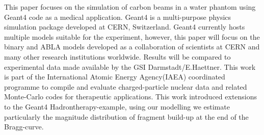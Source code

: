 \begin{abstractpage}[english]
This paper focuses on the simulation of carbon beams in a water phantom using Geant4 code as a medical application. Geant4 is a multi-purpose physics simulation package developed at CERN, Switzerland. Geant4 currently hosts multiple models suitable for the experiment, however, this paper will focus on the binary and ABLA models developed as a collaboration of scientists at CERN and many other research institutions worldwide. Results will be compared to experimental data made available by the GSI Darmstadt/E.Haettner. This work is part of the International Atomic Energy Agency(IAEA) coordinated programme to compile and evaluate charged-particle nuclear data and related Monte-Carlo codes for therapeutic applications. This work introduced extensions to the Geant4 Hadrontherapy-example, using our modelling we estimate particularly the magnitude distribution of fragment build-up at the end of the Bragg-curve.
\end{abstractpage}

\newpage



